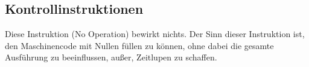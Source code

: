 \subsection{Kontrollinstruktionen}

Diese Instruktion (\glqq No Operation\grqq) bewirkt nichts.
Der Sinn dieser Instruktion ist, den Maschinencode mit Nullen füllen zu können,
ohne dabei die gesamte Ausführung zu beeinflussen, außer, Zeitlupen zu schaffen. 

